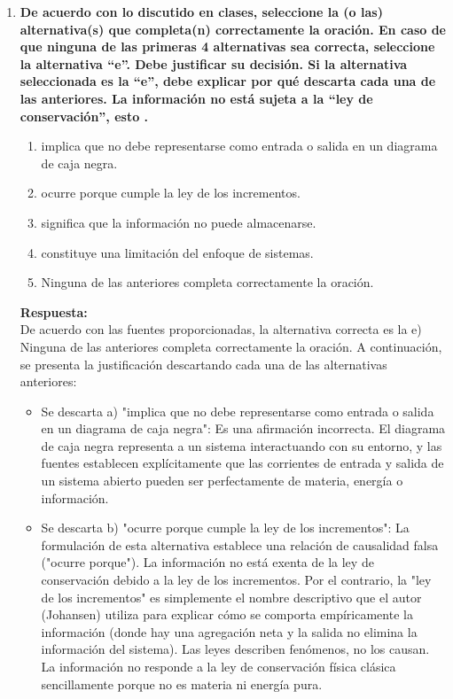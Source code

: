 \documentclass[12pt,a4paper]{article}
\begin{document}
\begin{enumerate}[label=\textbf{Pregunta \arabic*.}]
    \item \textbf{De acuerdo con lo discutido en clases, seleccione la (o las) alternativa(s) que completa(n) correctamente la oración. En caso de que ninguna de las primeras 4 alternativas sea correcta, seleccione la alternativa “e”. Debe justificar su decisión. Si la alternativa seleccionada es la “e”, debe explicar por qué descarta cada una de las anteriores. La información no está sujeta a la “ley de conservación”, esto \underline{\hspace{3cm}}.}
          \begin{enumerate}
              \item implica que no debe representarse como entrada o salida en un diagrama de caja negra.
              \item ocurre porque cumple la ley de los incrementos.
              \item significa que la información no puede almacenarse.
              \item constituye una limitación del enfoque de sistemas.
              \item Ninguna de las anteriores completa correctamente la oración.
          \end{enumerate}
          \textbf{Respuesta:} \\
          De acuerdo con las fuentes proporcionadas, la alternativa correcta es la e) Ninguna de las anteriores completa correctamente la oración.
          A continuación, se presenta la justificación descartando cada una de las alternativas anteriores:
          \begin{itemize}
              \item Se descarta a) "implica que no debe representarse como entrada o salida en un diagrama de caja negra": Es una afirmación incorrecta. El diagrama de caja negra representa a un sistema interactuando con su entorno, y las fuentes establecen explícitamente que las corrientes de entrada y salida de un sistema abierto pueden ser perfectamente de materia, energía o información.
              \item Se descarta b) "ocurre porque cumple la ley de los incrementos": La formulación de esta alternativa establece una relación de causalidad falsa ("ocurre porque"). La información no está exenta de la ley de conservación debido a la ley de los incrementos. Por el contrario, la "ley de los incrementos" es simplemente el nombre descriptivo que el autor (Johansen) utiliza para explicar cómo se comporta empíricamente la información (donde hay una agregación neta y la salida no elimina la información del sistema). Las leyes describen fenómenos, no los causan. La información no responde a la ley de conservación física clásica sencillamente porque no es materia ni energía pura.

\end{itemize}
\end{enumerate}
\end{document}
